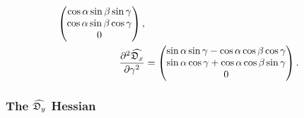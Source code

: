 \begin{subequations}
\begin{align}
\begin{pmatrix}
        \cos \alpha \sin \beta \sin \gamma \\
        \cos \alpha \sin \beta \cos \gamma \\
        0 \\
    \end{pmatrix}, \\
    \frac{\partial^2 \widehat{\mathfrak{D}_x}}{\partial \gamma^2} &= \begin{pmatrix}
        \sin \alpha \sin \gamma - \cos \alpha \cos \beta \cos \gamma \\
        \sin \alpha \cos \gamma + \cos \alpha \cos \beta \sin \gamma \\
        0 \\
    \end{pmatrix}.
\end{align}
\end{subequations}



\subsubsection{The $\widehat{\mathfrak{D}_y}$ Hessian}

